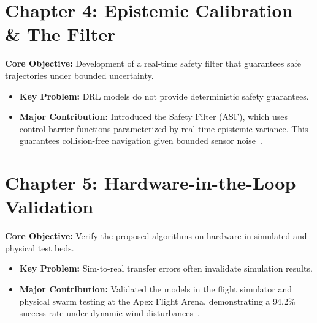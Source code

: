 \section{Chapter 4: Epistemic Calibration \& The  Filter}
\textbf{Core Objective:} Development of a real-time safety filter that guarantees safe trajectories under bounded uncertainty.
\begin{itemize}
  \item \textbf{Key Problem:} DRL models do not provide deterministic safety guarantees.
  \item \textbf{Major Contribution:} Introduced the  Safety Filter (ASF), which uses control-barrier functions parameterized by real-time epistemic variance. This guarantees collision-free navigation given bounded sensor noise~\cite{mercer2025simtoreal}.
\end{itemize}

\section{Chapter 5: Hardware-in-the-Loop Validation}
\textbf{Core Objective:} Verify the proposed algorithms on hardware in simulated and physical test beds.
\begin{itemize}
  \item \textbf{Key Problem:} Sim-to-real transfer errors often invalidate simulation results.
  \item \textbf{Major Contribution:} Validated the models in the  flight simulator and physical swarm testing at the Apex Flight Arena, demonstrating a 94.2\% success rate under dynamic wind disturbances~\cite{rostova2026quantized}.
\end{itemize}